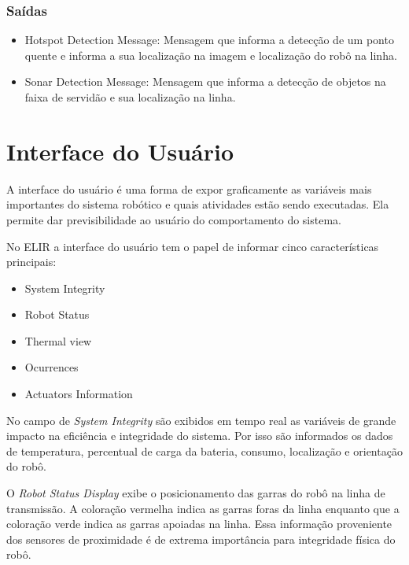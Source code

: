 \subsubsection{Saídas}

\begin{itemize}
	\item Hotspot Detection Message: Mensagem que informa a detecção de um ponto quente e informa a sua localização na imagem e localização do robô na linha.
	\item Sonar Detection Message: Mensagem que informa a detecção de objetos na faixa de servidão e sua localização na linha.
\end{itemize}
\pagebreak

\section{Interface do Usuário}
\label{sec:ui}

A interface do usuário é uma forma de expor graficamente as variáveis mais importantes do sistema robótico e quais atividades estão sendo executadas. Ela permite dar previsibilidade ao usuário do comportamento do sistema. 

No ELIR a interface do usuário tem o papel de informar cinco características principais:

\begin{itemize}
	\item System Integrity
	\item Robot Status
	\item Thermal view
	\item Ocurrences
	\item Actuators Information
\end{itemize}

No campo de \textit{System Integrity} são exibidos em tempo real as variáveis de grande impacto na eficiência e integridade do sistema. Por isso são informados os dados de temperatura, percentual de carga da bateria, consumo, localização e orientação do robô.

O \textit{Robot Status Display} exibe o posicionamento das garras do robô na linha de transmissão. A coloração vermelha indica as garras foras da linha enquanto que a coloração verde indica as garras apoiadas na linha. Essa informação proveniente dos sensores de proximidade é de extrema importância para integridade física do robô.

